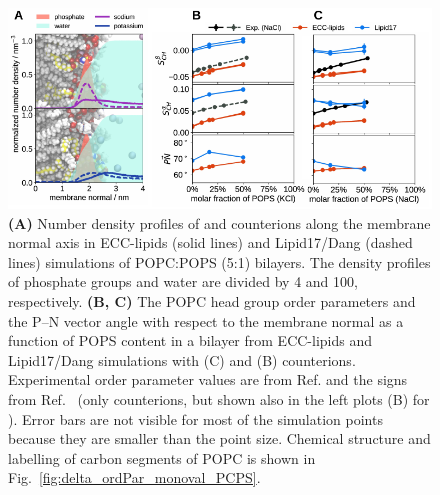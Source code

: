 \documentclass[journal=jpcbfk,manuscript=article]{achemso}
\newlength{\figwidth}
\newlength{\figwidthfull}
\begin{document}
\begin{figure}[!tbp] 
  \centering 
  \includegraphics[width=\figwidthfull]{../img/deltaOP_mix_PC-PS.pdf} 
  \caption{\label{fig:delta_ordPar_NaCl_PC-PS_mix_PC} 
    \textbf{(A)} Number density profiles of  and  counterions along the membrane normal axis
    in ECC-lipids (solid lines) and Lipid17/Dang (dashed lines) simulations of POPC:POPS (5:1) bilayers.  
    The density profiles of phosphate groups and water are divided by 4 and 100, respectively.  
    \textbf{(B, C)} The POPC head group order parameters and the P--N vector angle
    with respect to the membrane normal as a function of POPS content in a bilayer
    from ECC-lipids and Lipid17/Dang simulations with  (C) and  (B) counterions.
    Experimental order parameter values are from Ref. 
    and the signs from Ref.~ 
    (only  counterions, but shown also in the left plots (B) for ).
    Error bars are not visible for most of the simulation points because they are smaller than the point size.
    Chemical structure and labelling of carbon segments of POPC is shown in Fig.~\ref{fig:delta_ordPar_monoval_PCPS}. 
  }
\end{figure} 
\end{document}
